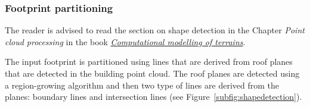 \subsubsection{Footprint partitioning}
\begin{myfloat}
	\begin{link-box}
		The reader is advised to read the section on shape detection in the Chapter \emph{Point cloud processing} in the book \href{https://github.com/tudelft3d/terrainbook/releases}{\emph{Computational modelling of terrains}}.
	\end{link-box}
\end{myfloat}
The input footprint is partitioned using lines that are derived from roof planes that are detected in the building point cloud.
The roof planes are detected using a region-growing algorithm and then two type of lines are derived from the planes: boundary lines and intersection lines (see Figure~\ref{subfig:shapedetection}).

